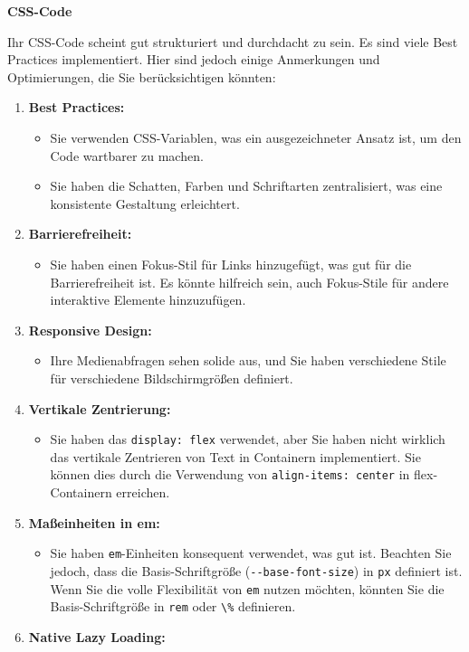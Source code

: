 \documentclass[12pt,a4paper]{scrartcl}
\newcommand{\tightlist}{
  \setlength{\itemsep}{0pt}\setlength{\parskip}{0pt}
}
\begin{document}
\textbf{CSS-Code}

Ihr CSS-Code scheint gut strukturiert und durchdacht zu sein. Es sind
viele Best Practices implementiert. Hier sind jedoch einige Anmerkungen
und Optimierungen, die Sie berücksichtigen könnten:

\begin{enumerate}
\def\labelenumi{\arabic{enumi}.}
\tightlist
\item
  \textbf{Best Practices:}

  \begin{itemize}
  \tightlist
  \item
    Sie verwenden CSS-Variablen, was ein ausgezeichneter Ansatz ist, um
    den Code wartbarer zu machen.
  \item
    Sie haben die Schatten, Farben und Schriftarten zentralisiert, was
    eine konsistente Gestaltung erleichtert.
  \end{itemize}
\item
  \textbf{Barrierefreiheit:}

  \begin{itemize}
  \tightlist
  \item
    Sie haben einen Fokus-Stil für Links hinzugefügt, was gut für die
    Barrierefreiheit ist. Es könnte hilfreich sein, auch Fokus-Stile für
    andere interaktive Elemente hinzuzufügen.
  \end{itemize}
\item
  \textbf{Responsive Design:}

  \begin{itemize}
  \tightlist
  \item
    Ihre Medienabfragen sehen solide aus, und Sie haben verschiedene
    Stile für verschiedene Bildschirmgrößen definiert.
  \end{itemize}
\item
  \textbf{Vertikale Zentrierung:}

  \begin{itemize}
  \tightlist
  \item
    Sie haben das {\lstinline!display: flex!} verwendet,
    aber Sie haben nicht wirklich das vertikale Zentrieren von Text in
    Containern implementiert. Sie können dies durch die Verwendung von
    {\lstinline!align-items: center!} in flex-Containern
    erreichen.
  \end{itemize}
\item
  \textbf{Maßeinheiten in em:}

  \begin{itemize}
  \tightlist
  \item
    Sie haben {\lstinline!em!}-Einheiten konsequent
    verwendet, was gut ist. Beachten Sie jedoch, dass die
    Basis-Schriftgröße ({\lstinline!--base-font-size!}) in
    {\lstinline!px!} definiert ist. Wenn Sie die volle
    Flexibilität von {\lstinline!em!} nutzen möchten,
    könnten Sie die Basis-Schriftgröße in {\lstinline!rem!}
    oder {\lstinline!\%!} definieren.
  \end{itemize}
\item
  \textbf{Native Lazy Loading:}


\end{enumerate}
\end{document}
